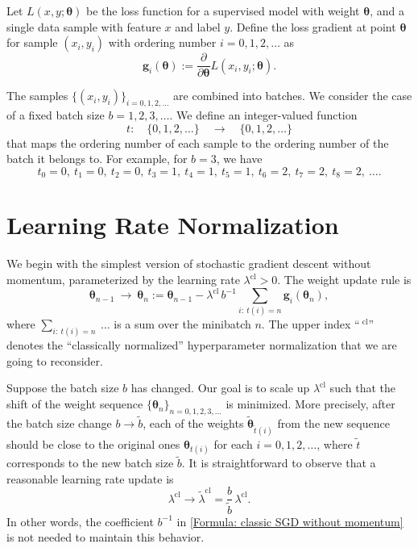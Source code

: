 \documentclass[12pt,a4paper]{amsart}
\numberwithin{equation}{section}
\theoremstyle{remark}
\begin{document}
Let
$L(x, y; \boldsymbol\theta)$
be the loss function for a supervised model with weight
$\boldsymbol\theta$,
and a single data sample with feature
$x$
and label
$y$.
Define the loss gradient at point
$\boldsymbol\theta$
for sample
$(x_i,y_i)$
with ordering number
$i=0,1,2,\ldots$
as
$$
	\mathbf{g}_i(\boldsymbol\theta) :=
	\frac{\partial}{\partial \boldsymbol\theta} L(x_i, y_i; \boldsymbol\theta).
$$

The samples
$\{(x_i,y_i)\}_{i=0,1,2,\ldots}$
are combined into batches.
We consider the case of a fixed batch size
$b=1,2,3,\ldots$.
We define an integer-valued function
$$
	t:\quad \{0,1,2,\ldots\} \quad \rightarrow \quad \{0,1,2,\ldots\}
$$
that maps the ordering number of each sample to the ordering number of the batch it belongs to.
For example, for
$b=3$,
we have
$$
	t_0 = 0,~t_1 = 0,~t_2 = 0,~t_3 = 1,~t_4 = 1,~t_5 = 1,~t_6 = 2,~t_7 = 2,~t_8 = 2,~\dotso.
$$


\section{Learning Rate Normalization}

We begin with the simplest version of stochastic gradient descent without momentum,
parameterized by the learning rate
$\lambda^{\text{cl}} > 0$.
The weight update rule is
\begin{equation}
	\boldsymbol\theta_{n-1}~ \rightarrow~ \boldsymbol\theta_n :=
	\boldsymbol\theta_{n-1} - \lambda^{\text{cl}} \, b^{-1} \sum_{i:~ t(i) = n} \mathbf{g}_i(\boldsymbol\theta_n),
	\label{Formula: classic SGD without momentum}
\end{equation}
where
$\sum_{i:~ t(i) = n}~\dotso$
is a sum over the minibatch
$n$.
The upper index
``$~^{\text{cl}}$''
denotes the ``classically normalized'' hyperparameter normalization that we are going to reconsider.

Suppose the batch size
$b$
has changed. Our goal is to scale up
$\lambda^{\text{cl}}$
such that the shift of the weight sequence
$\{\boldsymbol\theta_n\}_{n = 0,1,2,3,\ldots}$
is minimized.
More precisely,
after the batch size change
$b \rightarrow \tilde b$,
each of the weights
$\tilde{\boldsymbol\theta}_{\tilde t(i)}$
from the new sequence should be close to the original ones
$\boldsymbol\theta_{t(i)}$
for each $i=0,1,2,\ldots$,
where $\tilde t$ corresponds to the new batch size
$\tilde b$.
It is straightforward to observe that a reasonable learning rate update is
$$
	\lambda^{\text{cl}} \rightarrow \tilde \lambda^{\text{cl}} =
	\frac{b}{\tilde b}\, \lambda^{\text{cl}}.
$$
In other words, the coefficient
$b^{-1}$
in
\eqref{Formula: classic SGD without momentum}
is not needed to maintain this behavior.
\end{document}
